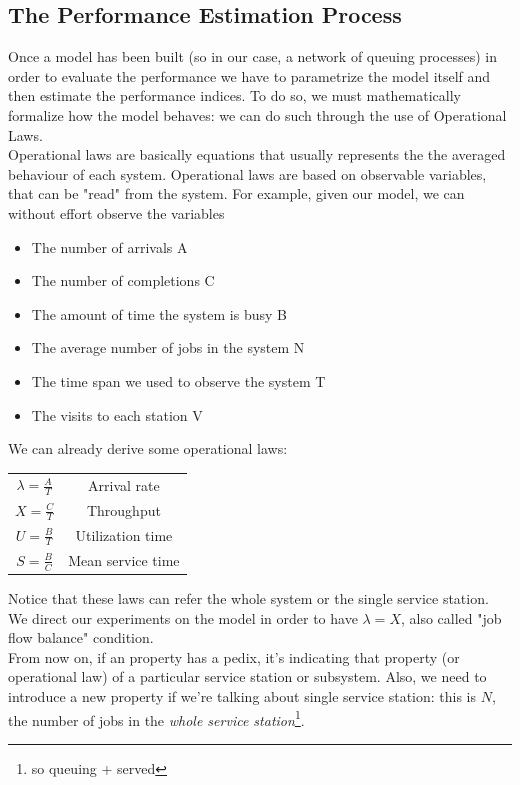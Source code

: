 \documentclass{article}
\begin{document}
			\subsection{The Performance Estimation Process}
				Once a model has been built (so in our case, a network of queuing processes) in order to evaluate the performance we have to parametrize the model itself and then estimate the performance indices. To do so, we must mathematically formalize how the model behaves: we can do such through the use of Operational Laws.\\
				Operational laws are basically equations that usually represents the the averaged behaviour of each system. Operational laws are based on observable variables, that can be "read" from the system. For example, given our model, we can without effort observe the variables
				\begin{itemize}
					\item The number of arrivals A
					\item The number of completions C
					\item The amount of time the system is busy B
					\item The average number of jobs in the system N
					\item The time span we used to observe the system T
					\item The visits to each station V
				\end{itemize}
				We can already derive some operational laws:
				\begin{center}
					\begin{tabular}{ | c | c |}
						\hline
						$ \lambda = \frac{A}{T} $ & Arrival rate \\
						$ X = \frac{C}{T} $ & Throughput \\
						$ U = \frac{B}{T} $ & Utilization time \\
						$ S = \frac{B}{C} $ & Mean service time\\
						\hline
					\end{tabular}
				\end{center}

				Notice that these laws can refer the whole system or the single service station. We direct our experiments on the model in order to have $\lambda = X$, also called "job flow balance" condition.\\
				From now on, if an property has a pedix, it's indicating that property (or operational law) of a particular service station or subsystem. Also, we need to introduce a new property if we're talking about single service station: this is $N$, the number of jobs in the \emph{whole service station}\footnote{so queuing + served}.
				
\end{document}
